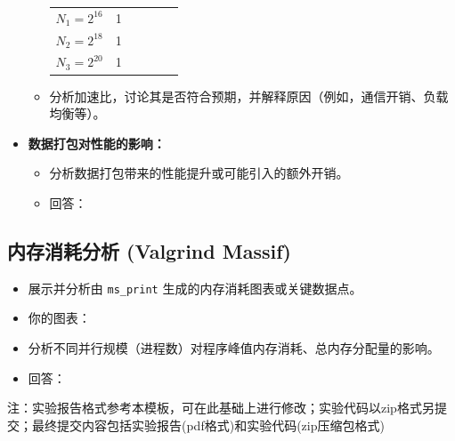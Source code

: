 \documentclass{SYSUReport}
\begin{document}
\begin{itemize}
\begin{itemize}
\begin{table}[h!]
\begin{tabular}{@{}lccccc@{}}
        $N_1 = 2^{16}$   & 1          &        &        &        &             \\
        $N_2 = 2^{18}$  & 1          &        &        &        &             \\
        $N_3 = 2^{20} $& 1          &        &        &        &             \\
        \bottomrule
        \end{tabular}
        \end{table}
        \item 分析加速比，讨论其是否符合预期，并解释原因（例如，通信开销、负载均衡等）。
    \end{itemize}
    \item \textbf{数据打包对性能的影响：}
    \begin{itemize}
        \item 分析数据打包带来的性能提升或可能引入的额外开销。
        \item 回答：
    \end{itemize}
\end{itemize}

\subsection{内存消耗分析 (Valgrind Massif)}
\begin{itemize}
    \item 展示并分析由 \texttt{ms\_print} 生成的内存消耗图表或关键数据点。
    \item 你的图表：
    \item 分析不同并行规模（进程数）对程序峰值内存消耗、总内存分配量的影响。
    \item 回答：
\end{itemize}


注：实验报告格式参考本模板，可在此基础上进行修改；实验代码以zip格式另提交；最终提交内容包括实验报告(pdf格式)和实验代码(zip压缩包格式)
\end{document}
